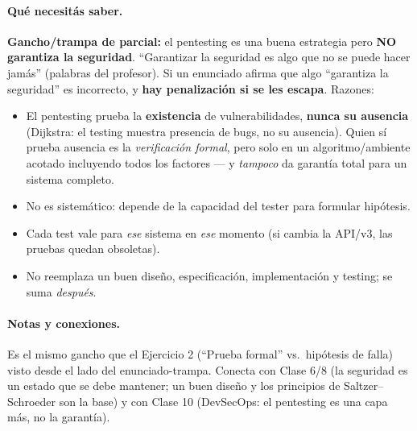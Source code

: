 \paragraph{Qué necesitás saber.}
\textbf{Gancho/trampa de parcial:} el pentesting es una buena estrategia pero \textbf{NO
garantiza la seguridad}. ``Garantizar la seguridad es algo que no se puede hacer jamás''
(palabras del profesor). Si un enunciado afirma que algo ``garantiza la seguridad'' es
incorrecto, y \textbf{hay penalización si se les escapa}. Razones:
\begin{itemize}
  \item El pentesting prueba la \textbf{existencia} de vulnerabilidades, \textbf{nunca su
  ausencia} (Dijkstra: el testing muestra presencia de bugs, no su ausencia). Quien sí
  prueba ausencia es la \emph{verificación formal}, pero solo en un algoritmo/ambiente
  acotado incluyendo todos los factores --- y \emph{tampoco} da garantía total para un
  sistema completo.
  \item No es sistemático: depende de la capacidad del tester para formular hipótesis.
  \item Cada test vale para \emph{ese} sistema en \emph{ese} momento (si cambia la API/v3,
  las pruebas quedan obsoletas).
  \item No reemplaza un buen diseño, especificación, implementación y testing; se suma
  \emph{después}.
\end{itemize}

\paragraph{Notas y conexiones.}
Es el mismo gancho que el Ejercicio 2 (``Prueba formal'' vs.\ hipótesis de falla) visto desde
el lado del enunciado-trampa. Conecta con Clase 6/8 (la seguridad es un estado que se debe
mantener; un buen diseño y los principios de Saltzer--Schroeder son la base) y con Clase 10
(DevSecOps: el pentesting es una capa más, no la garantía).

